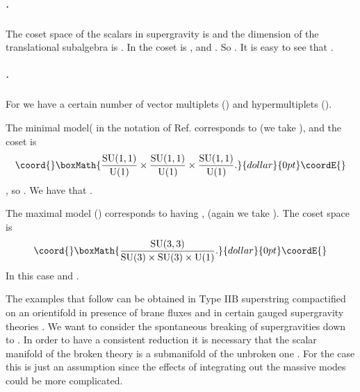 \documentclass[a4paper,12pt]{article}
\begin{document}
\subparagraph{\coordHE{}.} The coset space of the
scalars in  \coordHE{} supergravity is \coordHE{} and the
dimension of the translational subalgebra is \coordHE{} \cite{adfft}.
In \coordHE{} the coset is \coordHE{}, and \coordHE{}. So
\coordHE{}. It is easy to see that \coordHE{}.


\subparagraph{\coordHE{}.} For \coordHE{} we  have a
certain number of vector multiplets  (\coordHE{}) and hypermultiplets
(\coordHE{}).

The minimal model(\coordHE{} in the notation of
Ref. \cite{ss,css} corresponds to  \coordHE{} (we take \coordHE{}),
and  the coset is
$$\coord{}\boxMath{\frac{\rSU(1,1)}{\rU(1)}\times\frac{\rSU(1,1)}{\rU(1)}\times\frac{\rSU(1,1)}{\rU(1)}.
}{dollar}{0pt}\coordE{}$$\coordHE{}, so \coordHE{}. We have that  \coordHE{}.

The maximal model (\coordHE{}) corresponds to having \coordHE{}, (again we take \coordHE{}). The coset space is
$$\coord{}\boxMath{\frac{\rSU(3,3)}{\rSU(3)\times\rSU(3)\times\rU(1)}.}{dollar}{0pt}\coordE{}$$ In this case \coordHE{} and \coordHE{}.



\bigskip

The examples that follow can be obtained  in Type IIB superstring
 compactified on an orientifold \coordHE{} in presence of brane fluxes  \cite{fp,kst} and in certain
  gauged supergravity theories \cite{tz,dfv}.
We  want to consider the spontaneous breaking of \coordHE{}
supergravities down to \coordHE{}. In order to have a consistent
reduction it is necessary that  the scalar manifold of
 the broken theory is a submanifold of the unbroken one \cite{adf}. For the \coordHE{} case this is just
 an assumption since the effects of integrating out the massive modes could be more complicated.
\end{document}
